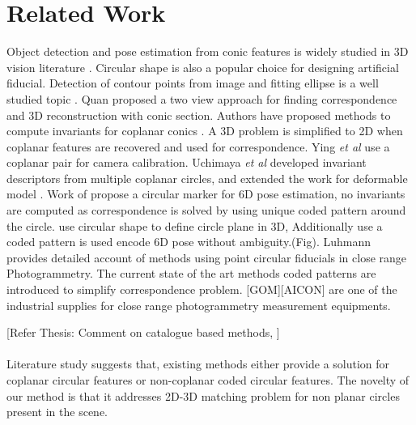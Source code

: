 \documentclass{bmvc2k}
\def\etal{\emph{et al}\bmvaOneDot}
\begin{document}
\section{Related Work}

Object detection and pose estimation from conic features is widely studied in 3D vision literature  \cite{dhome_spatial_1990}\cite{safaee-rad_three-dimensional_1992} \cite{werghi_pose_1996} \cite{quan_invariant_1995}. Circular shape is also a popular choice for designing artificial fiducial. Detection of contour points from image and fitting ellipse is a well studied topic \cite{fitzgibbon_direct_1999}. 
Quan \cite{quan_conic_1996} proposed a two view approach for finding correspondence and 3D reconstruction with conic section. Authors have proposed methods to compute invariants for coplanar conics \cite{forsyth_91} \cite{Ferri_1993}.  
A 3D problem is simplified to 2D when coplanar features are recovered and used for correspondence.  
Ying \etal \cite{ying_camera_2007} use a coplanar pair for camera calibration. 
Uchimaya \etal \cite{uchiyama_random_2011} developed invariant descriptors from multiple coplanar circles, and extended the work for deformable model \cite{uchiyama_deformable_2011}.
Work of \cite{lo_pez_de_ipin_a_trip:_2002} \cite{naimark_circular_2002} \cite{pagani_circular_2011} propose a circular marker for 6D pose estimation, no invariants are computed as correspondence is solved by using unique coded pattern around the circle. 
\cite{lo_pez_de_ipin_a_trip:_2002}\cite{pagani_circular_2011} use circular shape to define circle plane in 3D, Additionally use a coded pattern is used encode 6D pose without ambiguity.(Fig). 
Luhmann \cite{luhmann_close_2006} provides detailed account of methods using point circular fiducials in close range Photogrammetry. The current state of the art methods coded patterns are introduced to simplify correspondence problem.
[GOM][AICON] are one of the industrial supplies for close range photogrammetry measurement equipments. 

[Refer Thesis: Comment on catalogue based methods, ]
\paragraph{}
Literature study suggests that, existing methods either provide a solution for coplanar circular features or non-coplanar  coded circular features. The novelty of our method is that it addresses 2D-3D matching problem for non planar circles present in the scene. 
\end{document}
